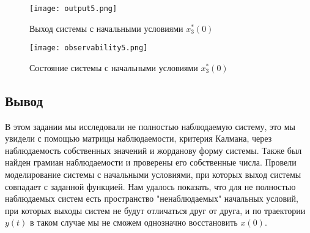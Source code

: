\newpage
\begin{figure}[ht]
\centering
\texttt{[image: output5.png]}
\caption{Выход системы с начальными условиями $x^*_3(0)$}
\end{figure}
\begin{figure}[ht]
\centering
\texttt{[image: observability5.png]}
\caption{Состояние системы с начальными условиями $x^*_3(0)$}
\end{figure}



\newpage
\subsection{Вывод}

В этом задании мы исследовали не полностью наблюдаемую систему, это мы увидели
с помощью матрицы  наблюдаемости, критерия Калмана, через наблюдаемость собственных значений и жорданову форму системы.
Также был найден грамиан наблюдаемости и проверены его собственные числа. 
Провели моделирование системы с начальными условиями, при которых выход системы совпадает
с заданной функцией. Нам удалось показать, что для не полностью наблюдаемых систем есть пространство "ненаблюдаемых" начальных условий, при которых
выходы систем не будут отличаться друг от друга, и по траектории $y(t)$ в таком случае мы не сможем однозначно восстановить $x(0)$.

\endinput
